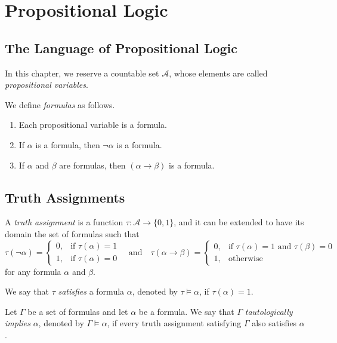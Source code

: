 \chapter{Propositional Logic}
\section{The Language of Propositional Logic}
In this chapter, we reserve a countable set $\mathcal{A}$, whose elements are
called \emph{propositional variables}.

\begin{definition}
  We define \emph{formulas} as follows.
  \begin{enumerate}[1.]
    \item Each propositional variable is a formula.
    \item If $\alpha$ is a formula, then $\neg\alpha$ is a formula.
    \item If $\alpha$ and $\beta$ are formulas, then $(\alpha \to \beta)$ is a
    formula.
  \end{enumerate}
\end{definition}

\section{Truth Assignments}
\begin{definition}
  A \emph{truth assignment} is a function $\tau: \mathcal{A} \to \{0, 1\}$, and
  it can be extended to have its domain the set of formulas such that
  \begin{equation*}
    \tau(\neg\alpha) =
    \begin{cases}
      0, & \text{if $\tau(\alpha) = 1$} \\
      1, & \text{if $\tau(\alpha) = 0$}
    \end{cases}
    \quad \text{and} \quad
    \tau(\alpha \to \beta) =
    \begin{cases}
      0, & \text{if $\tau(\alpha) = 1$ and $\tau(\beta) = 0$} \\
      1, & \text{otherwise}
    \end{cases}
  \end{equation*}
  for any formula $\alpha$ and $\beta$.

  We say that $\tau$ \emph{satisfies} a formula $\alpha$, denoted by
  $\tau \vDash \alpha$, if $\tau(\alpha) = 1$.
\end{definition}

\begin{definition}
  Let $\Gamma$ be a set of formulas and let $\alpha$ be a formula.
  We say that $\Gamma$ \emph{tautologically implies} $\alpha$, denoted by
  $\Gamma \vDash \alpha$, if every truth assignment satisfying $\Gamma$
  also satisfies $\alpha$.
\end{definition}

